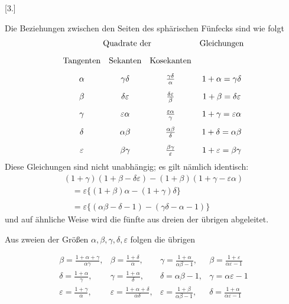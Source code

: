 \begingroup
\renewcommand{\arraystretch}{1.45}
\fancyhead[L]{}
\par\medskip{}\centerline{[3.]}\nobreak\smallskip
Die Beziehungen zwischen den Seiten des sphärischen Fünfecks sind wie folgt
\begingroup\small\setlength{\arraycolsep}{3pt}\[
\begin{array}{cccc} \multicolumn{3}{c}{\text{Quadrate der}}&\text{Gleichungen}\\[9pt] \text{Tangenten}&\text{Sekanten}&\text{Kosekanten}&\\[9pt] \alpha&\gamma\delta&\frac{\gamma\delta}{\alpha}&1+\alpha=\gamma\delta\\[9pt] \beta&\delta\varepsilon&\frac{\delta\varepsilon}{\beta}&1+\beta=\delta\varepsilon\\[9pt] \gamma&\varepsilon\alpha&\frac{\varepsilon\alpha}{\gamma}&1+\gamma=\varepsilon\alpha\\[9pt] \delta&\alpha\beta&\frac{\alpha\beta}{\delta}&1+\delta=\alpha\beta\\[9pt] \varepsilon&\beta\gamma&\frac{\beta\gamma}{\varepsilon}&1+\varepsilon=\beta\gamma \end{array}
\]\endgroup
Diese Gleichungen sind nicht unabhängig; es gilt nämlich identisch:
\[
\begin{gathered} (1+\gamma)(1+\beta-\delta\varepsilon) -(1+\beta)(1+\gamma-\varepsilon\alpha) \\[9pt]\quad{}=\varepsilon\{(1+\beta)\alpha-(1+\gamma)\delta\}\\[9pt] \\[9pt]\quad{}=\varepsilon\{(\alpha\beta-\delta-1)-(\gamma\delta-\alpha-1)\} \end{gathered}
\]
und auf ähnliche Weise wird die fünfte aus dreien der übrigen abgeleitet.

Aus zweien der Größen $\alpha,\beta,\gamma,\delta,\varepsilon$ folgen die übrigen
\par\nopagebreak%
\begingroup\small\setlength{\arraycolsep}{2pt}\[
\begin{array}{llll} \beta=\frac{1+\alpha+\gamma}{\alpha\gamma}, &\beta=\frac{1+\delta}{\alpha}, &\gamma=\frac{1+\alpha}{\alpha\beta-1}, &\beta=\frac{1+\varepsilon}{\alpha\varepsilon-1}\\[9pt] \delta=\frac{1+\alpha}{\gamma}, &\gamma=\frac{1+\alpha}{\delta}, &\delta=\alpha\beta-1, &\gamma=\alpha\varepsilon-1\\[9pt] \varepsilon=\frac{1+\gamma}{\alpha}, &\varepsilon=\frac{1+\alpha+\delta}{\alpha\delta}, &\varepsilon=\frac{1+\beta}{\alpha\beta-1}, &\delta=\frac{1+\alpha}{\alpha\varepsilon-1} \end{array}
\]\endgroup\par%


